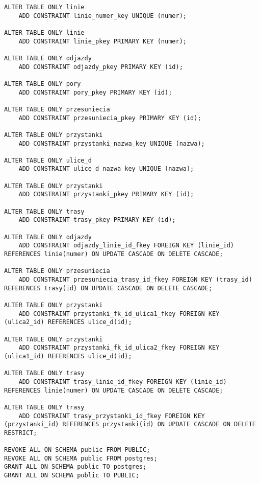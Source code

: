 \begin{lstlisting}
ALTER TABLE ONLY linie
    ADD CONSTRAINT linie_numer_key UNIQUE (numer);

ALTER TABLE ONLY linie
    ADD CONSTRAINT linie_pkey PRIMARY KEY (numer);

ALTER TABLE ONLY odjazdy
    ADD CONSTRAINT odjazdy_pkey PRIMARY KEY (id);

ALTER TABLE ONLY pory
    ADD CONSTRAINT pory_pkey PRIMARY KEY (id);

ALTER TABLE ONLY przesuniecia
    ADD CONSTRAINT przesuniecia_pkey PRIMARY KEY (id);

ALTER TABLE ONLY przystanki
    ADD CONSTRAINT przystanki_nazwa_key UNIQUE (nazwa);

ALTER TABLE ONLY ulice_d
    ADD CONSTRAINT ulice_d_nazwa_key UNIQUE (nazwa);

ALTER TABLE ONLY przystanki
    ADD CONSTRAINT przystanki_pkey PRIMARY KEY (id);

ALTER TABLE ONLY trasy
    ADD CONSTRAINT trasy_pkey PRIMARY KEY (id);

ALTER TABLE ONLY odjazdy
    ADD CONSTRAINT odjazdy_linie_id_fkey FOREIGN KEY (linie_id) REFERENCES linie(numer) ON UPDATE CASCADE ON DELETE CASCADE;

ALTER TABLE ONLY przesuniecia
    ADD CONSTRAINT przesuniecia_trasy_id_fkey FOREIGN KEY (trasy_id) REFERENCES trasy(id) ON UPDATE CASCADE ON DELETE CASCADE;

ALTER TABLE ONLY przystanki
    ADD CONSTRAINT przystanki_fk_id_ulica1_fkey FOREIGN KEY (ulica2_id) REFERENCES ulice_d(id);

ALTER TABLE ONLY przystanki
    ADD CONSTRAINT przystanki_fk_id_ulica2_fkey FOREIGN KEY (ulica1_id) REFERENCES ulice_d(id);

ALTER TABLE ONLY trasy
    ADD CONSTRAINT trasy_linie_id_fkey FOREIGN KEY (linie_id) REFERENCES linie(numer) ON UPDATE CASCADE ON DELETE CASCADE;

ALTER TABLE ONLY trasy
    ADD CONSTRAINT trasy_przystanki_id_fkey FOREIGN KEY (przystanki_id) REFERENCES przystanki(id) ON UPDATE CASCADE ON DELETE RESTRICT;

REVOKE ALL ON SCHEMA public FROM PUBLIC;
REVOKE ALL ON SCHEMA public FROM postgres;
GRANT ALL ON SCHEMA public TO postgres;
GRANT ALL ON SCHEMA public TO PUBLIC;

\end{lstlisting}



